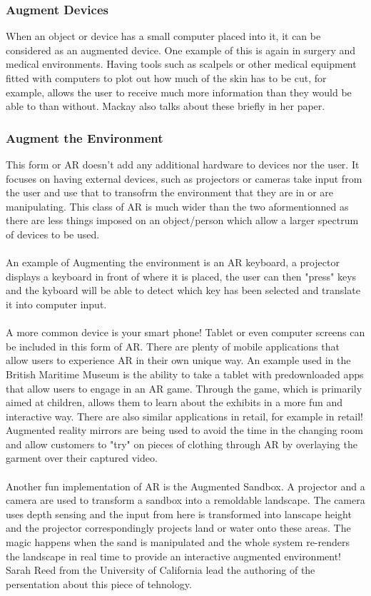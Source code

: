 \documentclass[11pt]{article}
\begin{document}
\subsubsection{Augment Devices} 
When an object or device has a small computer placed into it, it can be 
considered as an augmented device. One example of this is again in 
surgery and medical environments. Having tools such as scalpels or other 
medical equipment fitted with computers to plot out how much of the skin has
to be cut, for example, allows the user to receive much more information
than they would be able to than without. Mackay also talks about these briefly 
in her paper.

\subsubsection{Augment the Environment} 
This form or AR doesn't add any additional hardware to devices nor the user.
It focuses on having external devices, such as projectors or cameras take 
input from the user and use that to transofrm the environment that they are in
or are manipulating. This class of AR is much wider than the two 
aformentionned as there are less things imposed on an object/person which 
allow a larger spectrum of devices to be used. \\
\\
An example of Augmenting the environment is an AR keyboard, a projector displays
a keyboard in front of where it is placed, the user can then "press" keys and
the kyboard will be able to detect which key has been selected and translate it 
into computer input. \\
\\
A more common device is your smart phone! Tablet or even computer screens can
be included in this form of AR. There are plenty of mobile applications that
allow users to experience AR in their own unique way. An example used in the
British Maritime Museum is the ability to take a tablet with predownloaded apps
that allow users to engage in an AR game. Through the game, which is primarily
aimed at children, allows them to learn about the exhibits in a more fun and
interactive way. There are also similar applications in retail, for example
in retail! Augmented reality mirrors are being used to avoid the time in the
changing room and allow customers to "try" on pieces of clothing through
AR by overlaying the garment over their captured video. \\
\\
Another fun implementation of AR is the Augmented Sandbox. A projector and
a camera are used to transform a sandbox into a remoldable landscape. The camera
uses depth sensing and the input from here is transformed into lanscape height
and the projector correspondingly projects land or water onto these areas. The
magic happens when the sand is manipulated and the whole system re-renders the
landscape in real time to provide an interactive augmented environment! Sarah
Reed from the University of California lead the authoring of the persentation
about this piece of tehnology\cite{Reed14}.
\end{document}
